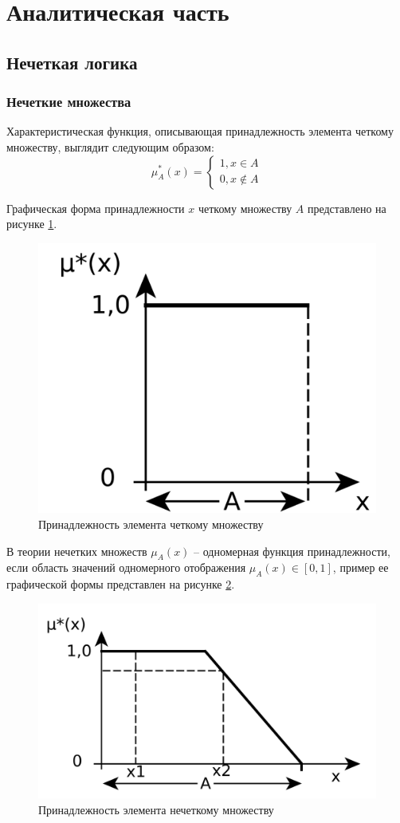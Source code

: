 \section{Аналитическая часть}
\subsection{Нечеткая логика}
\subsubsection{Нечеткие множества}
Характеристическая функция, описывающая принадлежность элемента четкому множеству, выглядит следующим образом:
\begin{equation}
\mu_{A}^*(x) = \left \{ \begin{array}{ll}
1, x \in A\\
0, x \notin A
\end{array} \right.
\end{equation}

Графическая форма принадлежности $x$ четкому множеству $A$ представлено на рисунке \ref{fig:binary}.
\begin{figure}[H]
	\centering
	\includegraphics[width=0.4\linewidth]{img/binary}
	\caption{Принадлежность элемента четкому множеству}
	\label{fig:binary}
\end{figure}

В теории нечетких множеств $\mu_{A}(x)$ -- одномерная функция принадлежности, если область значений одномерного отображения $\mu_{A}(x) \in [0,1]$, пример ее графической формы представлен на рисунке \ref{fig:fuzzy}.
\begin{figure}[H]
	\centering
	\includegraphics[width=0.6\linewidth]{img/fuzzy}
	\caption{Принадлежность элемента нечеткому множеству}
	\label{fig:fuzzy}
\end{figure}

